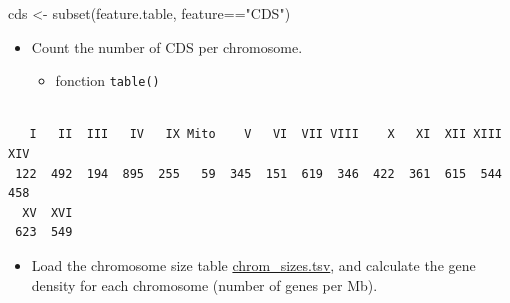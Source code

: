 \documentclass[]{article}
\newenvironment{Shaded}{\begin{snugshade}}{\end{snugshade}}
\newcommand{\KeywordTok}[1]{\textcolor[rgb]{0.94,0.87,0.69}{#1}}
\newcommand{\StringTok}[1]{\textcolor[rgb]{0.80,0.58,0.58}{#1}}
\newcommand{\OperatorTok}[1]{\textcolor[rgb]{0.94,0.94,0.82}{#1}}
\newcommand{\NormalTok}[1]{\textcolor[rgb]{0.80,0.80,0.80}{#1}}
\providecommand{\tightlist}{%
  \setlength{\itemsep}{0pt}\setlength{\parskip}{0pt}}
\begin{document}
\begin{Shaded}
\begin{Highlighting}[]
\NormalTok{cds <-}\StringTok{ }\KeywordTok{subset}\NormalTok{(feature.table, feature}\OperatorTok{==}\StringTok{"CDS"}\NormalTok{)}
\end{Highlighting}
\end{Shaded}

\begin{itemize}
\item
  Count the number of CDS per chromosome.

  \begin{itemize}
  \tightlist
  \item
    fonction \texttt{table()}
  \end{itemize}
\end{itemize}

\begin{Shaded}
\end{Shaded}

\begin{verbatim}

   I   II  III   IV   IX Mito    V   VI  VII VIII    X   XI  XII XIII  XIV 
 122  492  194  895  255   59  345  151  619  346  422  361  615  544  458 
  XV  XVI 
 623  549 
\end{verbatim}

\begin{itemize}
\tightlist
\item
  Load the chromosome size table
  \href{../../data/Saccharomyces_cerevisiae/chrom_sizes.tsv}{chrom\_sizes.tsv},
  and calculate the gene density for each chromosome (number of genes
  per Mb).
\end{itemize}
\end{document}
